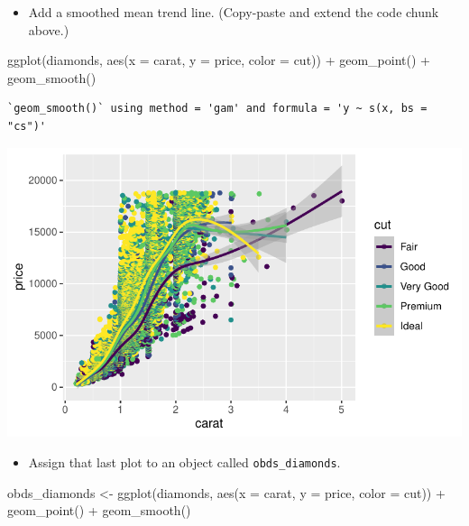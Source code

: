 \documentclass[
  letterpaper,
  DIV=11,
  numbers=noendperiod]{scrartcl}
\newenvironment{Shaded}{\begin{snugshade}}{\end{snugshade}}
\newcommand{\AttributeTok}[1]{\textcolor[rgb]{0.40,0.45,0.13}{#1}}
\newcommand{\FunctionTok}[1]{\textcolor[rgb]{0.28,0.35,0.67}{#1}}
\newcommand{\NormalTok}[1]{\textcolor[rgb]{0.00,0.23,0.31}{#1}}
\newcommand{\OtherTok}[1]{\textcolor[rgb]{0.00,0.23,0.31}{#1}}
\newcommand{\SpecialCharTok}[1]{\textcolor[rgb]{0.37,0.37,0.37}{#1}}
\providecommand{\tightlist}{%
  \setlength{\itemsep}{0pt}\setlength{\parskip}{0pt}}\usepackage{longtable,booktabs,array}
\begin{document}
\begin{itemize}
\tightlist
\item
  Add a smoothed mean trend line. (Copy-paste and extend the code chunk
  above.)
\end{itemize}

\begin{Shaded}
\begin{Highlighting}[]
\FunctionTok{ggplot}\NormalTok{(diamonds, }\FunctionTok{aes}\NormalTok{(}\AttributeTok{x =}\NormalTok{ carat, }\AttributeTok{y =}\NormalTok{ price, }\AttributeTok{color =}\NormalTok{ cut)) }\SpecialCharTok{+}
  \FunctionTok{geom\_point}\NormalTok{() }\SpecialCharTok{+}
  \FunctionTok{geom\_smooth}\NormalTok{()}
\end{Highlighting}
\end{Shaded}

\begin{verbatim}
`geom_smooth()` using method = 'gam' and formula = 'y ~ s(x, bs = "cs")'
\end{verbatim}

\includegraphics{5-ggplot2_kevin_files/figure-pdf/unnamed-chunk-7-1.pdf}

\begin{itemize}
\tightlist
\item
  Assign that last plot to an object called \texttt{obds\_diamonds}.
\end{itemize}

\begin{Shaded}
\begin{Highlighting}[]
\NormalTok{obds\_diamonds }\OtherTok{\textless{}{-}} \FunctionTok{ggplot}\NormalTok{(diamonds, }\FunctionTok{aes}\NormalTok{(}\AttributeTok{x =}\NormalTok{ carat, }\AttributeTok{y =}\NormalTok{ price, }\AttributeTok{color =}\NormalTok{ cut)) }\SpecialCharTok{+}
  \FunctionTok{geom\_point}\NormalTok{() }\SpecialCharTok{+}
  \FunctionTok{geom\_smooth}\NormalTok{()}
\end{Highlighting}
\end{Shaded}
\end{document}
